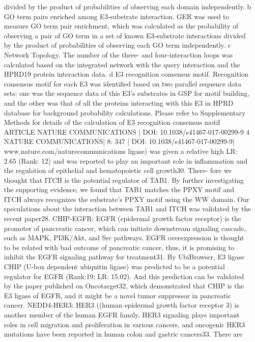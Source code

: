divided by the product of probabilities of observing each domain independently. b GO term pairs enriched among E3-substrate interaction. GER was used
to measure GO term pair enrichment, which was calculated as the probability of observing a pair of GO term in a set of known E3-substrate interactions
divided by the product of probabilities of observing each GO term independently. c Network Topology. The number of the three- and four-interaction loops
was calculated based on the integrated network with the query interaction and the HPRD19 protein interaction data. d E3 recognition consensus motif.
Recognition consensus motif for each E3 was identiﬁed based on two parallel sequence data sets: one was the sequence data of this E3’s substrates in GSP
for motif building, and the other was that of all the proteins interacting with this E3 in HPRD database for background probability calculations. Please refer
to Supplementary Methods for details of the calculation of E3 recognition consensus motif
ARTICLE
NATURE COMMUNICATIONS | DOI: 10.1038/s41467-017-00299-9
4
NATURE COMMUNICATIONS| 8:  347
| DOI: 10.1038/s41467-017-00299-9| www.nature.com/naturecommunications
ligase) was given a relative high LR: 2.65 (Rank: 12) and was
reported to play an important role in inﬂammation and the
regulation of epithelial and hematopoietic cell growth30. There-
fore we thought that ITCH is the potential regulator of TAB1. By
further investigating the supporting evidence, we found that
TAB1 matches the PPXY motif and ITCH always recognizes the
substrate’s PPXY motif using the WW domain. Our speculations
about the interaction between TAB1 and ITCH was validated by
the recent paper28.
CHIP-EGFR: EGFR (epidermal growth factor receptor) is the
promoter of pancreatic cancer, which can initiate downstream
signaling cascade, such as MAPK, PI3K/Akt, and Src pathways.
EGFR overexpression is thought to be related with bad outcome of
pancreatic cancer, thus, it is promising to inhibit the EGFR signaling
pathway for treatment31. By UbiBrowser, E3 ligase CHIP (U-box
dependent ubiquitin ligase) was predicted to be a potential regulator
for EGFR (Rank:19; LR: 15.02). And this prediction can be validated
by the paper published on Oncotarget32, which demonstrated that
CHIP is the E3 ligase of EGFR, and it might be a novel tumor
suppressor in pancreatic cancer.
NEDD4-HER3:
HER3
((human
epidermal
growth
factor
receptor 3) is another member of the human EGFR family.
HER3 signaling plays important roles in cell migration and
proliferation in various cancers, and oncogenic HER3 mutations
have been reported in human colon and gastric cancers33. There are
